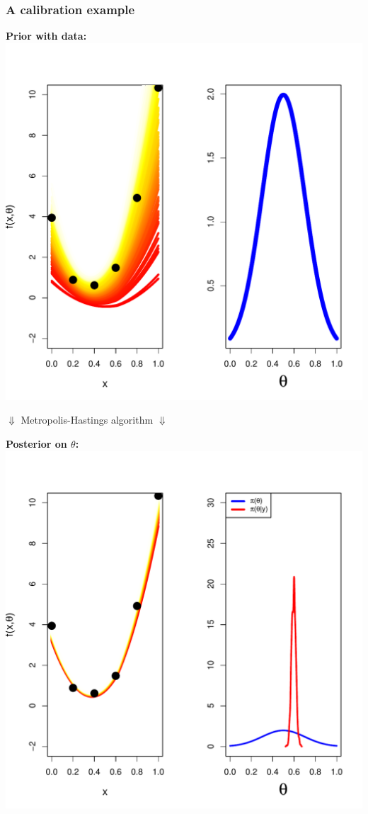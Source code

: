 \documentclass[nopagenumber,9pt]{beamer}
\begin{document}
\begin{frame}
 \frametitle{A calibration example}
 \textbf{Prior with data:}
  \includegraphics[width=.6\textwidth,height=.25\textwidth]{priordata.pdf}
 \\
 
 \bigskip
 \begin{scriptsize}
 
 \begin{center}
 $\Downarrow$
 Metropolis-Hastings algorithm $\Downarrow$
 \\
 \bigskip
  
 \end{center}

 \end{scriptsize}
 
 \textbf{Posterior on $\theta$:}
 \includegraphics[width=.6\textwidth,height=.25\textwidth]{calibbonpriorsigconnu.pdf}
 
\end{frame}
\end{document}
